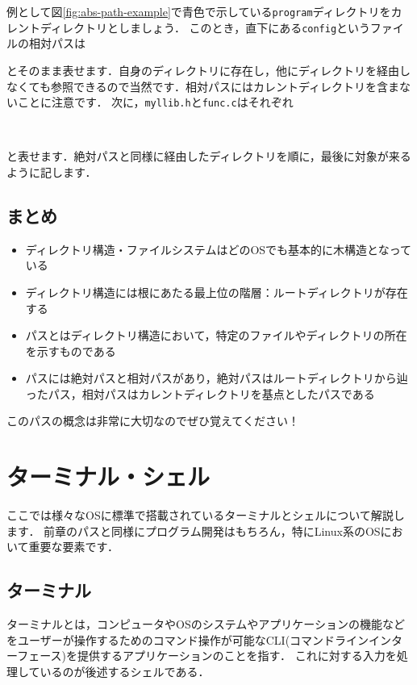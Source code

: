 \documentclass[autodetect-engine,dvi=dvipdfmx,ja=standard,a4j]{bxjsarticle}
\begin{document}
例として図\ref{fig:abs-path-example}で青色で示している\verb|program|ディレクトリをカレントディレクトリとしましょう．
このとき，直下にある\verb|config|というファイルの相対パスは
\begin{center}
\end{center}
とそのまま表せます．自身のディレクトリに存在し，他にディレクトリを経由しなくても参照できるので当然です．相対パスにはカレントディレクトリを含まないことに注意です．
次に，\verb|myllib.h|と\verb|func.c|はそれぞれ
\begin{center}
     \ \ 
\end{center}
と表せます．絶対パスと同様に経由したディレクトリを順に，最後に対象が来るように記します．

\subsection{まとめ}
\begin{itemize}
    \item ディレクトリ構造・ファイルシステムはどのOSでも基本的に木構造となっている
    \item ディレクトリ構造には根にあたる最上位の階層：ルートディレクトリが存在する
    \item パスとはディレクトリ構造において，特定のファイルやディレクトリの所在を示すものである
    \item パスには絶対パスと相対パスがあり，絶対パスはルートディレクトリから辿ったパス，相対パスはカレントディレクトリを基点としたパスである
\end{itemize}
このパスの概念は非常に大切なのでぜひ覚えてください！

\section{ターミナル・シェル}
ここでは様々なOSに標準で搭載されているターミナルとシェルについて解説します．
前章のパスと同様にプログラム開発はもちろん，特にLinux系のOSにおいて重要な要素です．

\subsection{ターミナル}
ターミナルとは，コンピュータやOSのシステムやアプリケーションの機能など
をユーザーが操作するためのコマンド操作が可能なCLI(コマンドラインインターフェース)を提供するアプリケーションのことを指す．
これに対する入力を処理しているのが後述するシェルである．
\end{document}
